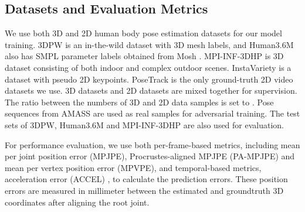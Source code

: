 \documentclass[10pt,twocolumn,letterpaper]{article}
\begin{document}
\subsection{Datasets and Evaluation Metrics}
We use both 3D and 2D human body pose estimation datasets for our model training. 3DPW \cite{von2018recovering} is an in-the-wild dataset with 3D mesh labels, and Human3.6M \cite{ionescu2013human3} also has SMPL parameter labels obtained from Mosh \cite{loper2014mosh}. MPI-INF-3DHP \cite{mehta2017monocular} is 3D dataset consisting of both indoor and complex outdoor scenes. InstaVariety \cite{kanazawa2019learning} is a dataset with pseudo 2D keypoints. PoseTrack \cite{andriluka2018posetrack} is the only ground-truth 2D video datasets we use. 3D datasets and 2D datasets are mixed together for supervision. The ratio between the numbers of 3D and 2D data samples is set to . Pose sequences from AMASS \cite{mahmood2019amass} are used as real samples for adversarial training. The test sets of 3DPW, Human3.6M and MPI-INF-3DHP are also used for evaluation.


For performance evaluation, we use both per-frame-based metrics, including mean per joint position error (MPJPE), Procrustes-aligned MPJPE (PA-MPJPE) and mean per vertex position error (MPVPE), and temporal-based metrics, acceleration error (ACCEL) \cite{kanazawa2019learning}, to calculate the prediction errors. These position errors are measured in millimeter between the estimated and groundtruth 3D coordinates after aligning the root joint.
\end{document}
